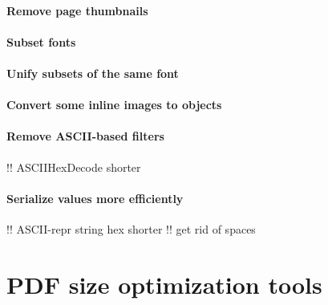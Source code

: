 \documentclass{ltugproc}
\begin{document}
\paragraph{Remove page thumbnails}

\paragraph{Subset fonts}

\paragraph{Unify subsets of the same font}

\paragraph{Convert some inline images to objects}

\paragraph{Remove ASCII-based filters}

!! ASCIIHexDecode shorter

\paragraph{Serialize values more efficiently}

!! ASCII-repr string hex shorter
!! get rid of spaces

\section{PDF size optimization tools}
\end{document}
